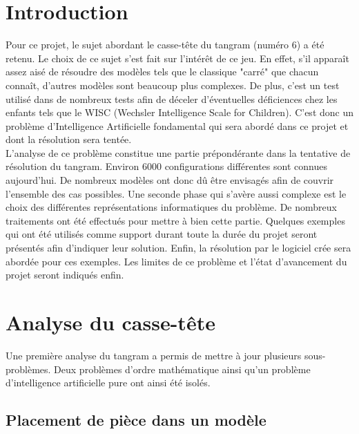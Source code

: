 \documentclass[a4paper, 11pt]{report}
\begin{document}
	\newpage
	
	
	
	\chapter*{Introduction}
	
		Pour ce projet, le sujet abordant le casse-tête du tangram (numéro 6) a été retenu. Le choix de ce sujet s'est fait sur l'intérêt de ce jeu. En effet, s'il apparaît assez aisé de résoudre des modèles tels que le classique "carré" que chacun connaît, d'autres modèles sont beaucoup plus complexes. De plus, c'est un test utilisé dans de nombreux tests afin de déceler d'éventuelles déficiences chez les enfants tels que le WISC (Wechsler Intelligence Scale for Children). C'est donc un problème d'Intelligence Artificielle fondamental qui sera abordé dans ce projet et dont la résolution sera tentée.\\
L'analyse de ce problème constitue une partie prépondérante dans la tentative de résolution du tangram. Environ 6000 configurations différentes sont connues aujourd'hui. De nombreux modèles ont donc dû être envisagés afin de couvrir l'ensemble des cas possibles. Une seconde phase qui s'avère aussi complexe est le choix des différentes représentations informatiques du problème. De nombreux traitements ont été effectués pour mettre à bien cette partie. Quelques exemples qui ont été utilisés comme support durant toute la durée du projet seront présentés afin d'indiquer leur solution. Enfin, la résolution par le logiciel crée sera abordée pour ces exemples. Les limites de ce problème et l'état d'avancement du projet seront indiqués enfin.


	\newpage

	\chapter{Analyse du casse-t\^ete}
	
	Une première analyse du tangram a permis de mettre à jour plusieurs sous-problèmes. Deux problèmes d'ordre mathématique ainsi qu'un problème d'intelligence artificielle pure ont ainsi été isolés. 
	
		\section{Placement de pièce dans un modèle}
		
\end{document}
